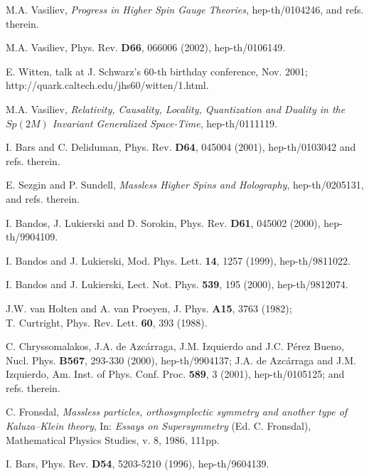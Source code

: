 \documentclass[a4paper,11pt]{article}
\begin{document}
{\small 
\begin{thebibliography}{99}


 M.A. Vasiliev, {\sl Progress in Higher Spin Gauge Theories}, hep-th/0104246, 
and refs. therein. 

M.A. Vasiliev, 
Phys. Rev. {\bf D66}, 066006 (2002),  hep-th/0106149. 

E. Witten, talk at J. Schwarz's 60-th birthday conference, 
Nov. 2001;  http://quark.caltech.edu/jhs60/witten/1.html. 


M.A. Vasiliev, {\sl Relativity, Causality, Locality, 
Quantization and Duality in the $Sp(2M)$ 
Invariant Generalized Space-Time}, hep-th/0111119.  

 I. Bars and C. Deliduman, 
Phys. Rev. {\bf D64}, 045004 (2001), hep-th/0103042 and refs. therein. 

 E. Sezgin and P. Sundell, {\sl Massless Higher Spins and Holography}, 
hep-th/0205131, and refs. therein. 

I. Bandos, J. Lukierski and D. Sorokin, Phys. Rev. {\bf D61},
045002 (2000), hep-th/9904109.

I. Bandos and J. Lukierski, Mod. Phys. Lett. {\bf 14}, 1257 (1999),
hep-th/9811022. 

I. Bandos and J. Lukierski,
Lect. Not. Phys. {\bf 539}, 195 
(2000), hep-th/9812074.

J.W. van Holten and A. van Proeyen, J. Phys. {\bf A15}, 3763 
(1982); \\ 
T. Curtright, Phys. Rev. Lett. {\bf 60}, 393 (1988).

 C. Chryssomalakos, J.A. de Azc\'{a}rraga, J.M. Izquierdo and 
J.C. P\'{e}rez Bueno, Nucl. Phys. {\bf B567}, 293-330 (2000),  
hep-th/9904137; J.A. de Azc\'{a}rraga and J.M. Izquierdo, 
Am. Inst. of Phys. Conf. Proc. {\bf 589}, 3 (2001), hep-th/0105125;  
and refs. therein. 

C. Fronsdal, {\sl Massless particles, orthosymplectic symmetry 
and another type of Kaluza--Klein theory}, 
In: {\it Essays on Supersymmetry} (Ed. C. Fronsdal), 
Mathematical Physics Studies, v. 8, 1986, 111pp.


I. Bars, 
Phys. Rev. {\bf D54},  
5203-5210 (1996), hep-th/9604139. 



\end{thebibliography}}
\end{document}

